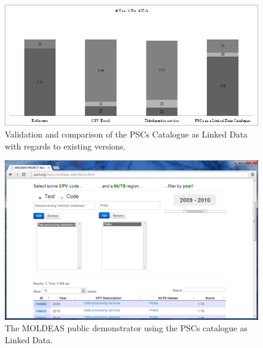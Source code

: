  \begin{figure}[!ht]
\centering
	\includegraphics[width=12cm]{./imgs/fig-3}
 \caption{Validation and comparison of the PSCs Catalogue as Linked Data with regards to existing versions.}
 \label{fig:results-4}
\end{figure}




 \begin{figure}[!ht]
\centering
	\includegraphics[width=12cm]{./imgs/fig-4}
 \caption{The MOLDEAS public demonstrator using the PSCs catalogue as Linked Data.}
 \label{fig:moldeas-snap}
\end{figure}
